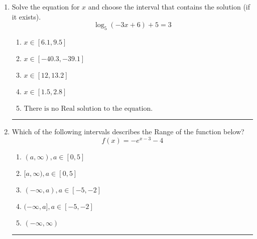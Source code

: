 \documentclass[14pt]{extbook}
\newcommand{\litem}[1]{\item#1\hspace*{-1cm}\rule{\textwidth}{0.4pt}}
\begin{document}
\begin{enumerate}
{\begin{enumerate}[label=\Alph*.]
\end{enumerate} }
\litem{
Solve the equation for $x$ and choose the interval that contains the solution (if it exists).\[ \log_{5}{(-3x+6)}+5 = 3 \]\begin{enumerate}[label=\Alph*.]
\item \( x \in [6.1, 9.5] \)
\item \( x \in [-40.3, -39.1] \)
\item \( x \in [12, 13.2] \)
\item \( x \in [1.5, 2.8] \)
\item \( \text{There is no Real solution to the equation.} \)

\end{enumerate} }
\litem{
Which of the following intervals describes the Range of the function below?\[ f(x) = -e^{x-3}-4 \]\begin{enumerate}[label=\Alph*.]
\item \( (a, \infty), a \in [0, 5] \)
\item \( [a, \infty), a \in [0, 5] \)
\item \( (-\infty, a), a \in [-5, -2] \)
\item \( (-\infty, a], a \in [-5, -2] \)
\item \( (-\infty, \infty) \)

\end{enumerate} }
\end{enumerate}
\end{document}
